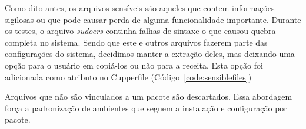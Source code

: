 Como dito antes, os arquivos sensíveis são aqueles que contem
informações sigilosas ou que pode causar perda de alguma funcionalidade importante.
Durante os testes, o arquivo \textit{sudoers} continha falhas de sintaxe o que causou
quebra completa no sistema. Sendo que este e outros arquivos fazerem parte das
configurações do sistema, decidimos manter a extração deles, mas deixando uma opção
para o usuário em copiá-los ou não para a receita. Esta opção foi adicionada como
atributo no Cupperfile (Código~\ref{code:sensiblefiles})

\noindent\begin{minipage}{\textwidth}
  \lstset{style=shell}
  
\end{minipage}\hfill

Arquivos que não são vinculados a um pacote são descartados. Essa abordagem força
a padronização de ambientes que seguem a instalação e configuração por pacote.

